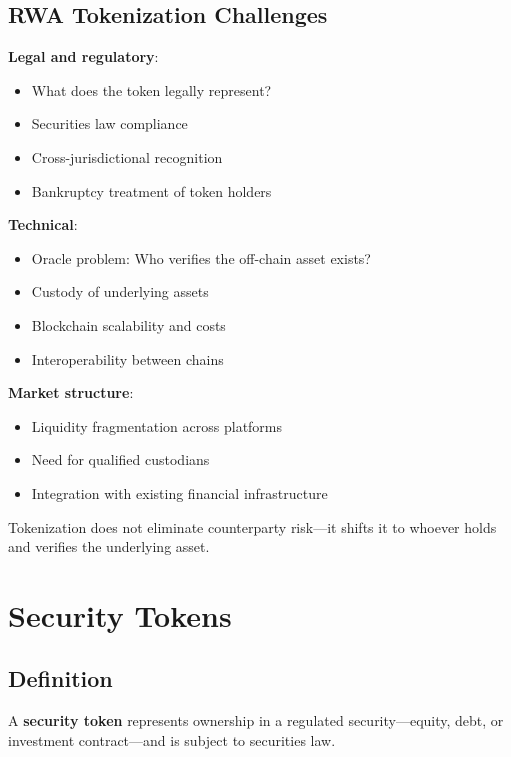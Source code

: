 \documentclass[11pt,a4paper]{article}
\newcommand{\keyword}[1]{\textbf{\textcolor{AccentOrange}{#1}}}
\begin{document}
\subsection{RWA Tokenization Challenges}

\textbf{Legal and regulatory}:
\begin{itemize}
    \item What does the token legally represent?
    \item Securities law compliance
    \item Cross-jurisdictional recognition
    \item Bankruptcy treatment of token holders
\end{itemize}

\textbf{Technical}:
\begin{itemize}
    \item Oracle problem: Who verifies the off-chain asset exists?
    \item Custody of underlying assets
    \item Blockchain scalability and costs
    \item Interoperability between chains
\end{itemize}

\textbf{Market structure}:
\begin{itemize}
    \item Liquidity fragmentation across platforms
    \item Need for qualified custodians
    \item Integration with existing financial infrastructure
\end{itemize}

Tokenization does not eliminate counterparty risk---it shifts it to whoever holds and verifies the underlying asset.

\section{Security Tokens}

\subsection{Definition}

A \keyword{security token} represents ownership in a regulated security---equity, debt, or investment contract---and is subject to securities law.
\end{document}
